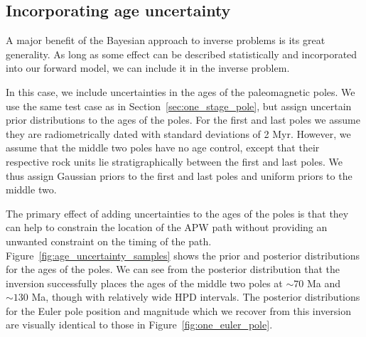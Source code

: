 \documentclass[preprint,12pt,authoryear]{elsarticle}
\begin{document}
\subsection{Incorporating age uncertainty}
\label{sec:age_uncertainty}
A major benefit of the Bayesian approach to inverse problems is its great generality.
As long as some effect can be described statistically and incorporated into our
forward model, we can include it in the inverse problem.

In this case, we include uncertainties in the ages of the paleomagnetic poles.
We use the same test case as in Section~\ref{sec:one_stage_pole}, but assign uncertain prior
distributions to the ages of the poles. For the first and last poles we assume they
are radiometrically dated with standard deviations of 2 Myr.
However, we assume that the middle two poles have no age control, except that their
respective rock units lie stratigraphically between the first and last poles.
We thus assign Gaussian priors to the first and last poles and uniform priors
to the middle two.

The primary effect of adding uncertainties to the ages of the poles is that they can
help to constrain the location of the APW path without providing an unwanted constraint
on the timing of the path.
Figure~\ref{fig:age_uncertainty_samples} shows the prior and posterior distributions for the
ages of the poles. We can see from the posterior distribution that the inversion
successfully places the ages of the middle two poles at $\sim70$ Ma and $\sim130$ Ma,
though with relatively wide HPD intervals.
The posterior distributions for the Euler pole position and magnitude 
which we recover from this inversion are visually identical to those in Figure~\ref{fig:one_euler_pole}.
\end{document}
